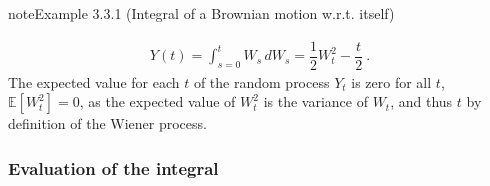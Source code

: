 \documentclass[letterpaper,10pt,english]{jupyterBook}
\begin{document}
\begin{sphinxadmonition}{note}{Example 3.3.1 (Integral of a Brownian motion w.r.t. itself)}


\begin{equation*}
\begin{split}Y(t) = \int_{s=0}^t W_s \, dW_s = \dfrac{1}{2} W_t^2 - \dfrac{t}{2} \ .\end{split}
\end{equation*}
\sphinxAtStartPar
The expected value for each \(t\) of the random process \(Y_t\) is zero for all \(t\), \(\mathbb{E}\left[ W_t^2 \right]= 0\), as the expected value of \(W_t^2\) is the variance of \(W_t\), and thus \(t\) by definition of the Wiener process.
\subsubsection*{Evaluation of the integral}


\end{sphinxadmonition}
\end{document}

